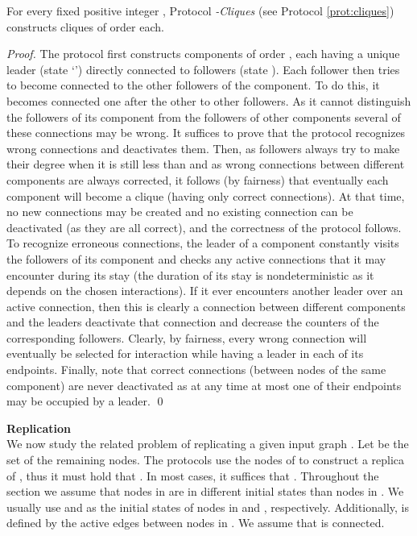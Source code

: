 \documentclass[oribibl, 11pt]{llncs}
\begin{document}
\begin{theorem}
For every fixed positive integer , Protocol \emph{-Cliques} (see Protocol \ref{prot:cliques}) constructs  cliques of order  each.
\end{theorem}
\begin{proof}
The protocol first constructs  components of order , each having a unique leader (state `') directly connected to  followers (state ). Each follower then tries to become connected to the other  followers of the component. To do this, it becomes connected one after the other to  other followers. As it cannot distinguish the followers of its component from the followers of other components several of these connections may be wrong. It suffices to prove that the protocol recognizes wrong connections and deactivates them. Then, as followers always try to make their degree  when it is still less than  and as wrong connections between different components are always corrected, it follows (by fairness) that eventually each component will become a clique (having only correct connections). At that time, no new connections may be created and no existing connection can be deactivated (as they are all correct), and the correctness of the protocol follows. To recognize erroneous connections, the leader of a component constantly visits the followers of its component and checks any active connections that it may encounter during its stay (the duration of its stay is nondeterministic as it depends on the chosen interactions). If it ever encounters another leader over an active connection, then this is clearly a connection between different components and the leaders deactivate that connection and decrease the counters of the corresponding followers. Clearly, by fairness, every wrong connection will eventually be selected for interaction while having a leader in each of its endpoints. Finally, note that correct connections (between nodes of the same component) are never deactivated as at any time at most one of their endpoints may be occupied by a leader.
\qed
\end{proof}

\noindent\textbf{Replication}\\

We now study the related problem of replicating a given input graph . Let  be the set of the remaining nodes. The protocols use the nodes of  to construct a replica  of , thus it must hold that . In most cases, it suffices that . Throughout the section we assume that nodes in  are in different initial states than nodes in . We usually use  and  as the initial states of nodes in  and , respectively. Additionally,  is defined by the active edges between nodes in . We assume that  is connected.
\end{document}
